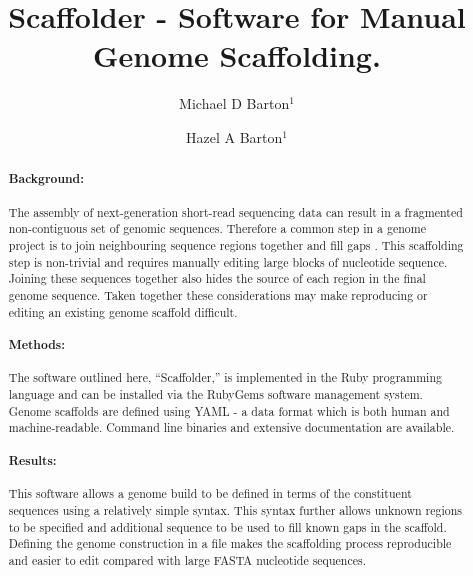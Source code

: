 \documentclass[10pt]{bmc_article}
\newenvironment{bmcformat}{\begin{raggedright}\baselineskip20pt\sloppy\setboolean{publ}{false}}{\end{raggedright}\baselineskip20pt\sloppy}
\begin{document}
\begin{bmcformat}

\title{Scaffolder - Software for Manual Genome
Scaffolding.}

\author{
  Michael D Barton$^{1}$\correspondingauthor%
\and
  Hazel A Barton$^{1}$%
      }


\address{
\iid(1) Biology Department, The University of Akron, Akron, %
OH 44325-3908, USA}

\maketitle

\clearpage

\begin{abstract} %

  \paragraph*{Background:} The assembly of next-generation short-read
  sequencing data can result in a fragmented non-contiguous set of genomic
  sequences. Therefore a common step in a genome project is to join
  neighbouring sequence regions together and fill gaps . This scaffolding step
  is non-trivial and requires manually editing large blocks of nucleotide
  sequence. Joining these sequences together also hides the source of each
  region in the final genome sequence. Taken together these considerations
  may make reproducing or editing an existing genome scaffold difficult.

  \paragraph*{Methods:} The software outlined here, ``Scaffolder,'' is
  implemented in the Ruby programming language and can be installed via the
  RubyGems software management system. Genome scaffolds are defined using
  YAML - a data format which is both human and machine-readable. Command line
  binaries and extensive documentation are available.

  \paragraph*{Results:} This software allows a genome build to be defined in
  terms of the constituent sequences using a relatively simple syntax. This
  syntax further allows unknown regions to be specified and additional sequence
  to be used to fill known gaps in the scaffold. Defining the genome construction
  in a file makes the scaffolding process reproducible and easier to edit
  compared with large FASTA nucleotide sequences.


\end{abstract}
\end{bmcformat}
\end{document}
